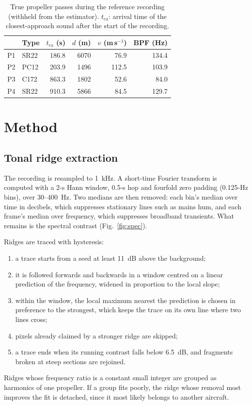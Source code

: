 \documentclass[10pt,twocolumn,letterpaper]{article}
\newcommand{\ca}{\mathrm{ca}}
\begin{document}
\begin{table}[t]
\caption{True propeller passes during the reference recording (withheld from the estimator). $t_\ca$: arrival
time of the closest-approach sound after the start of the recording.}\label{tab:truth}
\centering\small
\begin{tabular}{@{}llrrrr@{}}
\toprule
 & Type & $t_\ca$ (s) & $d$ (m) & $v$ (m\,s$^{-1}$) & BPF (Hz)\\
\midrule
P1 & SR22 & 186.8 & 6070 & 76.9 & 134.4\\
P2 & PC12 & 203.9 & 1496 & 112.5 & 103.9\\
P3 & C172 & 863.3 & 1802 & 52.6 & 84.0\\
P4 & SR22 & 910.3 & 5866 & 84.5 & 129.7\\
\bottomrule
\end{tabular}
\end{table}

\section{Method}\label{sec:method}

\subsection{Tonal ridge extraction}
The recording is resampled to 1~kHz. A short-time Fourier transform is computed with a 2-s Hann window, 0.5-s hop
and fourfold zero padding (0.125-Hz bins), over 30--400~Hz. Two medians are then removed: each bin's median over
time in decibels, which suppresses stationary lines such as mains hum, and each frame's median over frequency, which
suppresses broadband transients. What remains is the spectral contrast (Fig.~\ref{fig:spec}).

Ridges are traced with hysteresis:
\begin{enumerate}
\item a trace starts from a seed at least 11~dB above the background;
\item it is followed forwards and backwards in a window centred on a linear prediction of the frequency, widened in
  proportion to the local slope;
\item within the window, the local maximum nearest the prediction is chosen in preference to the strongest, which
  keeps the trace on its own line where two lines cross;
\item pixels already claimed by a stronger ridge are skipped;
\item a trace ends when its running contrast falls below 6.5~dB, and fragments broken at steep sections are rejoined.
\end{enumerate}
Ridges whose frequency ratio is a constant small integer are grouped as harmonics of one propeller. If a group fits
poorly, the ridge whose removal most improves the fit is detached, since it most likely belongs to another aircraft.
\end{document}
